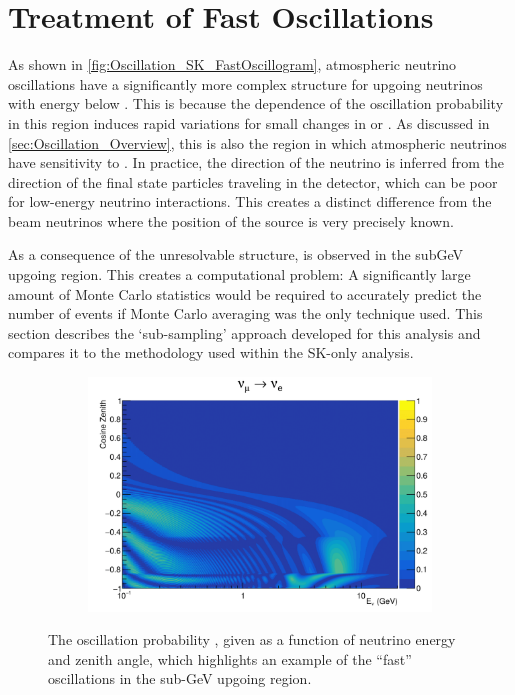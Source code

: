 \clearpage

\section{Treatment of Fast Oscillations}
\label{sec:Oscillation_FastOscillations}

As shown in \autoref{fig:Oscillation_SK_FastOscillogram}, atmospheric neutrino oscillations have a significantly more complex structure for upgoing neutrinos with energy below . This is because the  dependence of the oscillation probability in this region induces rapid variations for small changes in  or . As discussed in \autoref{sec:Oscillation_Overview}, this is also the region in which atmospheric neutrinos have sensitivity to \dcp. In practice, the direction of the neutrino is inferred from the direction of the final state particles traveling in the detector, which can be poor for low-energy neutrino interactions. This creates a distinct difference from the beam neutrinos where the position of the source is very precisely known.

As a consequence of the unresolvable structure,   is observed in the subGeV upgoing region. This creates a computational problem: A significantly large amount of Monte Carlo statistics would be required to accurately predict the number of events if Monte Carlo averaging was the only technique used. This section describes the `sub-sampling' approach developed for this analysis and compares it to the methodology used within the SK-only analysis.

\begin{figure}[h]
  \begin{subfigure}[t]{0.8\textwidth}
    \includegraphics[width=\textwidth, trim={0mm 0mm 0mm 0mm}, clip,page=1]{Figures/Oscillation/FastOscillationExample.pdf}
  \end{subfigure}
  \caption{The oscillation probability , given as a function of neutrino energy and zenith angle, which highlights an example of the ``fast'' oscillations in the sub-GeV upgoing region.}
  \label{fig:Oscillation_SK_FastOscillogram}
\end{figure}

